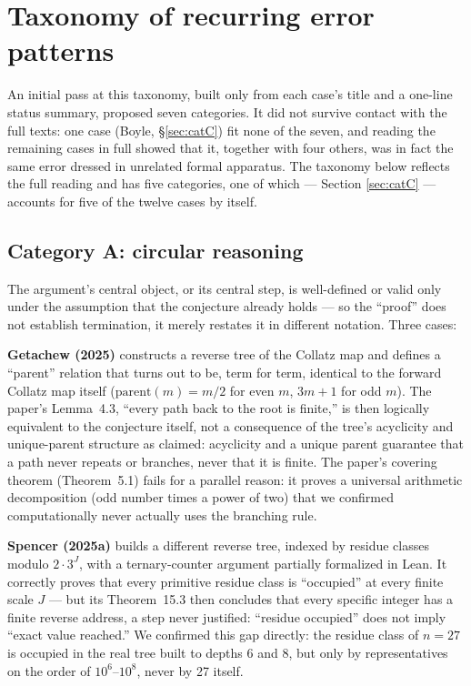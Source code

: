 \documentclass[11pt]{article}
\begin{document}
\section{Taxonomy of recurring error patterns}
\label{sec:taxonomy}

An initial pass at this taxonomy, built only from each case's title and
a one-line status summary, proposed seven categories. It did not
survive contact with the full texts: one case (Boyle, \S\ref{sec:catC})
fit none of the seven, and reading the remaining cases in full showed
that it, together with four others, was in fact the same error dressed
in unrelated formal apparatus. The taxonomy below reflects the full
reading and has five categories, one of which --- Section
\ref{sec:catC} --- accounts for five of the twelve cases by itself.

\subsection{Category A: circular reasoning}
\label{sec:catA}

The argument's central object, or its central step, is well-defined or
valid only under the assumption that the conjecture already holds ---
so the ``proof'' does not establish termination, it merely restates it
in different notation. Three cases:

\textbf{Getachew (2025)} \cite{Getachew2025} constructs a reverse tree
of the Collatz map and defines a ``parent'' relation that turns out to
be, term for term, identical to the forward Collatz map itself
(\(\mathrm{parent}(m) = m/2\) for even \(m\), \(3m+1\) for odd \(m\)).
The paper's Lemma~4.3, ``every path back to the root is finite,'' is
then logically equivalent to the conjecture itself, not a consequence
of the tree's acyclicity and unique-parent structure as claimed:
acyclicity and a unique parent guarantee that a path never repeats or
branches, never that it is finite. The paper's covering theorem
(Theorem~5.1) fails for a parallel reason: it proves a universal
arithmetic decomposition (odd number times a power of two) that we
confirmed computationally never actually uses the branching rule.

\textbf{Spencer (2025a)} \cite{Spencer2025a} builds a different reverse
tree, indexed by residue classes modulo \(2\cdot 3^J\), with a
ternary-counter argument partially formalized in Lean. It correctly
proves that every primitive residue class is ``occupied'' at every
finite scale \(J\) --- but its Theorem~15.3 then concludes that every
specific integer has a finite reverse address, a step never justified:
``residue occupied'' does not imply ``exact value reached.'' We
confirmed this gap directly: the residue class of \(n=27\) is occupied
in the real tree built to depths 6 and 8, but only by representatives
on the order of \(10^6\)--\(10^8\), never by 27 itself.
\end{document}
